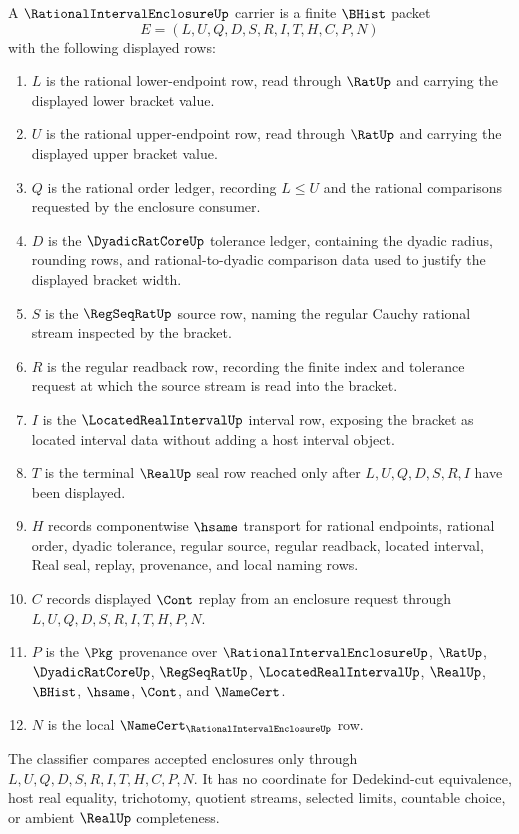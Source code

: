 \begin{definition}
\label{def:rational-interval-enclosure-carrier}
A $\RationalIntervalEnclosureUp$ carrier is a finite $\BHist$ packet
$$
E=(L,U,Q,D,S,R,I,T,H,C,P,N)
$$
with the following displayed rows:
\begin{enumerate}
\item $L$ is the rational lower-endpoint row, read through $\RatUp$ and carrying the displayed lower bracket value.
\item $U$ is the rational upper-endpoint row, read through $\RatUp$ and carrying the displayed upper bracket value.
\item $Q$ is the rational order ledger, recording $L \leq U$ and the rational comparisons requested by the enclosure consumer.
\item $D$ is the $\DyadicRatCoreUp$ tolerance ledger, containing the dyadic radius, rounding rows, and rational-to-dyadic comparison data used to justify the displayed bracket width.
\item $S$ is the $\RegSeqRatUp$ source row, naming the regular Cauchy rational stream inspected by the bracket.
\item $R$ is the regular readback row, recording the finite index and tolerance request at which the source stream is read into the bracket.
\item $I$ is the $\LocatedRealIntervalUp$ interval row, exposing the bracket as located interval data without adding a host interval object.
\item $T$ is the terminal $\RealUp$ seal row reached only after $L,U,Q,D,S,R,I$ have been displayed.
\item $H$ records componentwise $\hsame$ transport for rational endpoints, rational order, dyadic tolerance, regular source, regular readback, located interval, Real seal, replay, provenance, and local naming rows.
\item $C$ records displayed $\Cont$ replay from an enclosure request through $L,U,Q,D,S,R,I,T,H,P,N$.
\item $P$ is the $\Pkg$ provenance over $\RationalIntervalEnclosureUp$, $\RatUp$, $\DyadicRatCoreUp$, $\RegSeqRatUp$, $\LocatedRealIntervalUp$, $\RealUp$, $\BHist$, $\hsame$, $\Cont$, and $\NameCert$.
\item $N$ is the local $\NameCert_{\RationalIntervalEnclosureUp}$ row.
\end{enumerate}
The classifier compares accepted enclosures only through $L,U,Q,D,S,R,I,T,H,C,P,N$. It has no coordinate for Dedekind-cut equivalence, host real equality, trichotomy, quotient streams, selected limits, countable choice, or ambient $\RealUp$ completeness.
\end{definition}

